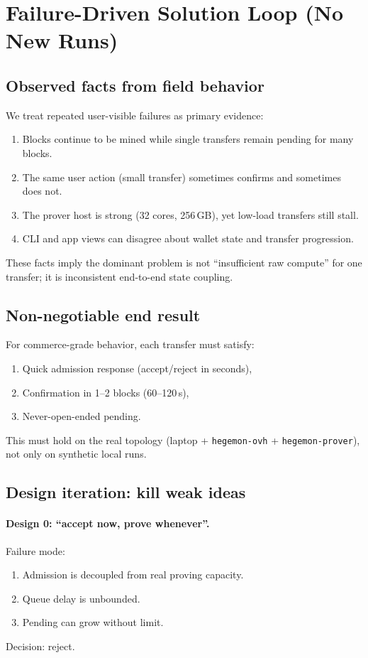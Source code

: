 \documentclass[11pt]{article}
\begin{document}
\section{Failure-Driven Solution Loop (No New Runs)}

\subsection{Observed facts from field behavior}

We treat repeated user-visible failures as primary evidence:
\begin{enumerate}[leftmargin=2em]
  \item Blocks continue to be mined while single transfers remain pending for many blocks.
  \item The same user action (small transfer) sometimes confirms and sometimes does not.
  \item The prover host is strong (32 cores, 256\,GB), yet low-load transfers still stall.
  \item CLI and app views can disagree about wallet state and transfer progression.
\end{enumerate}

These facts imply the dominant problem is not ``insufficient raw compute'' for one
transfer; it is inconsistent end-to-end state coupling.

\subsection{Non-negotiable end result}

For commerce-grade behavior, each transfer must satisfy:
\begin{enumerate}[leftmargin=2em]
  \item Quick admission response (accept/reject in seconds),
  \item Confirmation in 1--2 blocks (60--120\,s),
  \item Never-open-ended pending.
\end{enumerate}

This must hold on the real topology (laptop + \texttt{hegemon-ovh} + \texttt{hegemon-prover}),
not only on synthetic local runs.

\subsection{Design iteration: kill weak ideas}

\paragraph{Design 0: ``accept now, prove whenever''.}
Failure mode:
\begin{enumerate}[leftmargin=2em]
  \item Admission is decoupled from real proving capacity.
  \item Queue delay is unbounded.
  \item Pending can grow without limit.
\end{enumerate}
Decision: reject.
\end{document}

